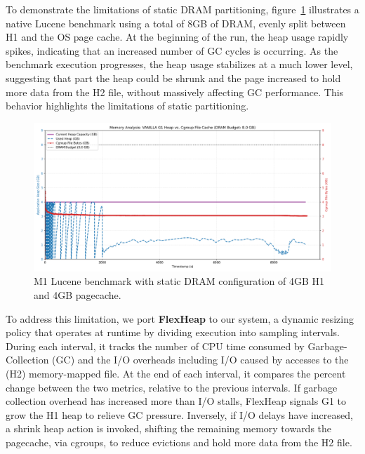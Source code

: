 To demonstrate the limitations of static DRAM partitioning,
figure~\ref{fig:vanilla-dram-underutilization} illustrates a native Lucene
benchmark using a total of 8GB of DRAM, evenly split between H1 and the OS page
cache. At the beginning of the run, the heap usage rapidly spikes, indicating
that an increased number of GC cycles is occurring. As the benchmark execution
progresses, the heap usage stabilizes at a much lower level, suggesting that
part the heap could be shrunk and the page increased to hold more data from the
H2 file, without massively affecting GC performance. This behavior highlights
the limitations of static partitioning.
\begin{figure}[htbp]
	\centering
	\includegraphics[width=1\linewidth]{fig/combined_memory_timeline_vanilla_g1.png}
	\caption{
		M1 Lucene benchmark with static DRAM configuration of 4GB H1 and 4GB pagecache.
	}
	\label{fig:vanilla-dram-underutilization}
\end{figure}

To address this limitation, we port \textbf{FlexHeap} \cite{flexheap} to our system, a dynamic
resizing policy that operates at runtime by dividing execution into sampling
intervals. During each interval, it tracks the number of CPU time consumed by Garbage-Collection (GC)
and the I/O overheads including I/O caused by accesses to
the (H2) memory-mapped file. At the end of each interval, it compares the
percent change between the two metrics, relative to the previous intervals. If
garbage collection overhead has increased more than I/O stalls, FlexHeap
signals G1 to grow the H1 heap to relieve GC pressure. Inversely, if I/O delays
have increased, a shrink heap action is invoked, shifting the remaining memory
towards the pagecache, via cgroups, to reduce evictions and hold more data from
the H2 file.

%

